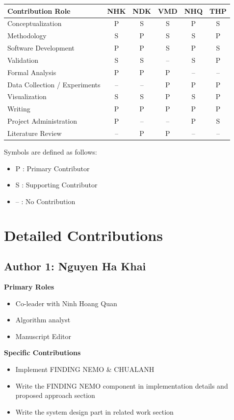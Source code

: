 \documentclass[11pt,a4paper]{article}
\begin{document}
\begin{center}
\small
\begin{tabular}{p{5cm}ccccc}
\toprule
\textbf{Contribution Role}
& NHK & NDK & VMD & NHQ & THP \\
\midrule
Conceptualization & P & S & S & P & S \\
Methodology & S & P & S & S & P \\
Software Development & P & P & S & P & S \\
Validation & S & S & -- & S & P \\
Formal Analysis & P & P & P & -- & -- \\
Data Collection / Experiments & -- & -- & P & P & P \\
Visualization & S & S & P & S & P \\
Writing & P & P & P & P & P \\
Project Administration & P & -- & -- & P & S \\
Literature Review & -- & P & P & -- & -- \\
\bottomrule
\end{tabular}
\end{center}

\noindent
Symbols are defined as follows:
\begin{itemize}
    \item P : Primary Contributor
    \item S : Supporting Contributor
    \item -- : No Contribution
\end{itemize}

\section{Detailed Contributions}

\subsection*{Author 1: Nguyen Ha Khai}

\textbf{Primary Roles}
\begin{itemize}
    \item Co-leader with Ninh Hoang Quan
    \item Algorithm analyst
    \item Manuscript Editor
\end{itemize}

\textbf{Specific Contributions}
\begin{itemize}
    \item Implement FINDING NEMO \& CHUALANH
    \item Write the FINDING NEMO component in implementation details and proposed approach section
    \item Write the system design part in related work section
\end{itemize}
\end{document}
